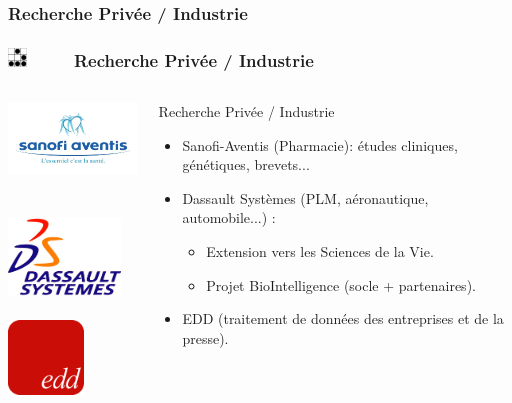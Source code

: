 \documentclass[slidetop,11pt]{beamer}
\def\sectionPartIIbTR{Recherche Priv{\'e}e / Industrie}
\def\moreInFrameTitle{\includegraphics[height=0.5cm]{img/logo_glider.png}~~~~~}
\begin{document}
\subsubsection{\sectionPartIIbTR}
\begin{frame}
	\frametitle{\moreInFrameTitle \sectionPartIIbTR}
	\begin{columns}[c]
	\begin{column}[c]{5cm}
		\includegraphics[width=4cm]{img/logo_sanofiaventis_FR.png}~\\~\\
		\includegraphics[width=3cm]{img/logo_dassault_systemes_16_09_2009_13_50_26.png}~\\~\\
		\includegraphics[width=2cm]{img/logo_edd.png}
	\end{column}
	\begin{column}[c]{7cm}
		 \begin{beamerboxesrounded}	[lower=substructureDE, %
		 				 upper=block title DE,%
						 shadow=true]%
		       {\sectionPartIIbTR}
			\begin{itemize}
				\item Sanofi-Aventis (Pharmacie): {\'e}tudes cliniques, g{\'e}n{\'e}tiques, brevets...
				\item Dassault Syst{\`e}mes (PLM, a{\'e}ronautique, automobile...) : 
				\begin{itemize} 
					\item Extension vers les Sciences de la Vie. 
					\item Projet BioIntelligence (socle + partenaires). 
				\end{itemize}
				\item EDD (traitement de donn{\'e}es des entreprises et de la presse). 
			\end{itemize}
		\end{beamerboxesrounded}
	\end{column}
	\end{columns}
\end{frame}
\end{document}
